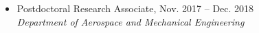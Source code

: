\documentclass[10pt]{article}
\newenvironment{myitemize}
{ \begin{itemize}
    \setlength{\itemsep}{0pt}
    \setlength{\parskip}{0pt}
    \setlength{\parsep}{0pt}     }
{ \end{itemize}                  }
\begin{document}
\begin{myitemize}
\item Postdoctoral Research Associate, Nov. 2017 -- Dec. 2018 \\
{\em Department of Aerospace and Mechanical Engineering}
\end{myitemize}

\end{document}
